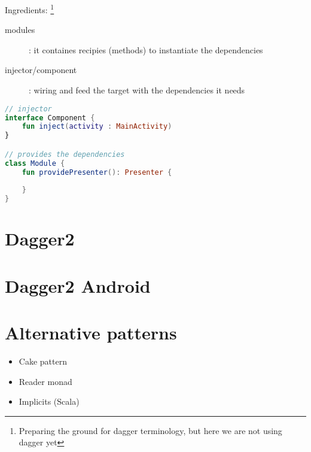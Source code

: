 \documentclass[10pt]{beamer}
\begin{document}
\begin{frame}[fragile]
	Ingredients:%
	\footnote{Preparing the ground for dagger terminology, but here we are not using dagger yet}
	\begin{description}
		\item[modules]: it containes recipies (methods) to instantiate the dependencies 
		\item[injector/component]: wiring  and feed the target with the dependencies it needs 
	\end{description}
\end{frame}
\begin{frame}[fragile]
\begin{lstlisting}[language=Kotlin, basicstyle=\ttfamily]
// injector 
interface Component {
    fun inject(activity : MainActivity)
}

// provides the dependencies 
class Module {
    fun providePresenter(): Presenter {
        
    }
}
\end{lstlisting} 
\end{frame}
	\section{Dagger2}
	\section{Dagger2 Android }
	\section{Alternative patterns}
	\begin{frame}
		\begin{itemize}
			\item Cake pattern
			\item Reader monad 
			\item Implicits (Scala)
		\end{itemize}
	\end{frame}

% 
% 
\end{document}
